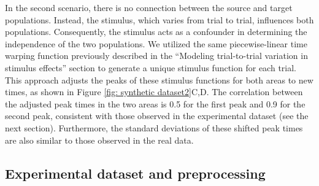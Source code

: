 \documentclass[12pt]{article}
\begin{document}
In the second scenario, there is no connection between the source and target populations. Instead, the stimulus, which varies from trial to trial, influences both populations. Consequently, the stimulus acts as a confounder in determining the independence of the two populations. We utilized the same piecewise-linear time warping function previously described in the ``Modeling trial-to-trial variation in stimulus effects'' section to generate a unique stimulus function for each trial. This approach adjusts the peaks of these stimulus functions for both areas to new times, as shown in Figure \ref{fig: synthetic dataset2}C,D. The correlation between the adjusted peak times in the two areas is 0.5 for the first peak and 0.9 for the second peak, consistent with those observed in the experimental dataset (see the next section). Furthermore, the standard deviations of these shifted peak times are also similar to those observed in the real data.

\subsection{Experimental dataset and preprocessing}
\label{sec:Experimental dataset and preprocessing}
\end{document}
